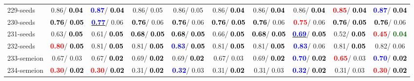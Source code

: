 \begin{table}[h]
\begin{center}
{\begin{tabular}{lc|c|c|c|c|c|c|c|c}
229-seeds &   0.86/\textcolor{black}{\textbf{  0.04}} & \textcolor{blue}{\textbf{  0.87}}/\textcolor{black}{\textbf{  0.04}} &   0.86/  0.05 &   0.86/  0.05 &   0.86/\textcolor{black}{\textbf{  0.04}} &   0.86/\textcolor{black}{\textbf{  0.04}} &   0.86/\textcolor{black}{\textbf{  0.04}} & \textcolor{red}{\textbf{  0.85}}/\textcolor{black}{\textbf{  0.04}} & \textcolor{blue}{\textbf{  0.87}}/\textcolor{black}{\textbf{  0.04}} \\
230-seeds & \textcolor{black}{\textbf{  0.76}}/\textcolor{black}{\textbf{  0.05}} & \underline{\textcolor{blue}{\textbf{  0.77}}}/  0.06 & \textcolor{black}{\textbf{  0.76}}/  0.06 & \textcolor{black}{\textbf{  0.76}}/  0.06 & \textcolor{black}{\textbf{  0.76}}/\textcolor{black}{\textbf{  0.05}} & \textcolor{black}{\textbf{  0.76}}/  0.06 & \textcolor{red}{\textbf{  0.75}}/  0.06 & \textcolor{black}{\textbf{  0.76}}/\textcolor{black}{\textbf{  0.05}} & \textcolor{black}{\textbf{  0.76}}/  0.06 \\
231-seeds &   0.63/\textcolor{black}{\textbf{  0.05}} &   0.61/\textcolor{black}{\textbf{  0.05}} & \textcolor{black}{\textbf{  0.68}}/\textcolor{black}{\textbf{  0.05}} & \textcolor{black}{\textbf{  0.68}}/\textcolor{black}{\textbf{  0.05}} &   0.66/\textcolor{black}{\textbf{  0.05}} & \textcolor{black}{\textbf{  0.68}}/\textcolor{black}{\textbf{  0.05}} & \underline{\textcolor{blue}{\textbf{  0.69}}}/\textcolor{black}{\textbf{  0.05}} &   0.52/\textcolor{black}{\textbf{  0.05}} & \textcolor{red}{\textbf{  0.45}}/\textcolor{darkgreen}{\textbf{  0.04}} \\ \hline
232-seeds & \textcolor{red}{\textbf{  0.80}}/\textcolor{black}{\textbf{  0.05}} &   0.81/\textcolor{black}{\textbf{  0.05}} &   0.81/\textcolor{black}{\textbf{  0.05}} & \textcolor{blue}{\textbf{  0.83}}/\textcolor{black}{\textbf{  0.05}} &   0.81/\textcolor{black}{\textbf{  0.05}} &   0.81/\textcolor{black}{\textbf{  0.05}} & \textcolor{blue}{\textbf{  0.83}}/  0.06 &   0.81/\textcolor{black}{\textbf{  0.05}} &   0.82/  0.06 \\
233-semeion &   0.67/  0.03 &   0.67/\textcolor{black}{\textbf{  0.02}} &   0.69/\textcolor{black}{\textbf{  0.02}} &   0.69/\textcolor{black}{\textbf{  0.02}} &   0.67/  0.03 &   0.69/\textcolor{black}{\textbf{  0.02}} & \textcolor{blue}{\textbf{  0.70}}/\textcolor{black}{\textbf{  0.02}} & \textcolor{red}{\textbf{  0.65}}/  0.03 & \textcolor{blue}{\textbf{  0.70}}/\textcolor{black}{\textbf{  0.02}} \\
234-semeion & \textcolor{red}{\textbf{  0.30}}/\textcolor{black}{\textbf{  0.02}} & \textcolor{red}{\textbf{  0.30}}/\textcolor{black}{\textbf{  0.02}} &   0.31/\textcolor{black}{\textbf{  0.02}} & \textcolor{blue}{\textbf{  0.32}}/  0.03 &   0.31/\textcolor{black}{\textbf{  0.02}} &   0.31/  0.03 & \textcolor{blue}{\textbf{  0.32}}/\textcolor{black}{\textbf{  0.02}} &   0.31/  0.03 & \textcolor{red}{\textbf{  0.30}}/\textcolor{black}{\textbf{  0.02}} \\

\end{tabular}}
\end{center}
\end{table}
